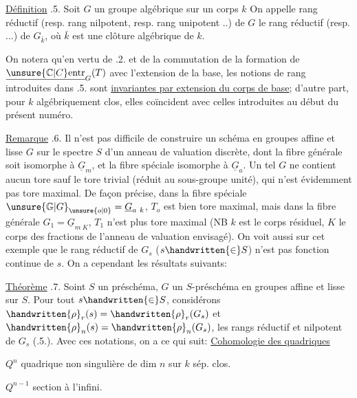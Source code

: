 \uline{Définition} .5. Soit $G$ un groupe algébrique sur un corps $k$  On appelle rang réductif (resp. rang nilpotent, resp. rang unipotent ..) de $G$ le rang réductif (resp. ...) de $G_{\bar k}$, où $\bar k$ est une clôture algébrique de $k$.

On notera qu'en vertu de .2. et de la commutation de la formation de $\underline{\unsure{\mathbb C|C}\mathrm{entr}}_G(T)$ avec l'extension de la base,  les  notions de rang introduites dans .5. sont \uline{invariantes par extension du corps de base}; d'autre part, pour $k$ algébriquement clos, elles coïncident avec celles introduites au début du présent numéro.

\uline{Remarque} .6. Il n'est pas difficile de construire un schéma en groupes affine et lisse $G$ sur le spectre $S$ d'un anneau de valuation discrète, dont la fibre générale soit isomorphe à $\underline G_m$, et la fibre spéciale isomorphe à $\underline G_a$. Un tel $G$ ne contient aucun tore sauf le tore trivial  (réduit au sous-groupe unité), qui n'est évidemment pas tore maximal. De façon précise, dans la fibre spéciale $\unsure{\mathbb G|G}_{\unsure{o|0}}=\underline G_{a\ k}$, $T_o$ est bien tore maximal, mais dans la fibre générale $G_1=\underline G_{m\ K}$, $T_1$ n'est plus tore maximal (NB $k$ est le corps résiduel, $K$ le corps des fractions de l'anneau de valuation envisagé). On voit aussi sur cet exemple que le rang réductif de $G_s$ ($s\handwritten{\in}S$) n'est pas fonction continue de $s$. On a cependant les résultats suivants:

\uline{Théorème} .7. Soint $S$ un préschéma, $G$ un $S$-préschéma en groupes affine et lisse sur $S$. Pour tout $s\handwritten{\in}S$, considérons $\handwritten{\rho}_r(s)=\handwritten{\rho}_r(G_s)$ et $\handwritten{\rho}_n(s)=\handwritten{\rho}_n(G_s)$, les rangs réductif et nilpotent de $G_s$ (.5.). Avec ces notations, on a ce qui suit:
\uline{Cohomologie des quadriques}

$Q^n$ quadrique non singulière de dim $n$ sur $k$ sép. clos.

$Q^{n-1}$ section à l'infini.

